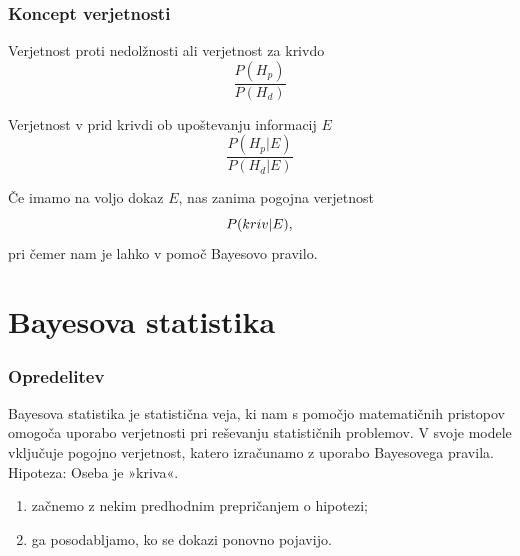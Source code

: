 \documentclass{beamer}
\begin{document}
\begin{frame}
    \frametitle{Koncept verjetnosti}
    \begin{beamerboxesrounded}[]{Verjetnost proti nedolžnosti ali verjetnost za krivdo}
        \[
            \frac{P(H_p)}{P(H_d)}
        \]    
    \end{beamerboxesrounded} \vspace{3mm}
    \begin{beamerboxesrounded}[]{Verjetnost v prid krivdi ob upoštevanju informacij $E$}
        \[
            \frac{P(H_p \lvert E)}{P(H_d \lvert E)} 
        \]    
    \end{beamerboxesrounded} \vspace{5mm}
    Če imamo na voljo dokaz $E$, nas zanima pogojna verjetnost
    \[
        P(kriv \lvert E), \vspace{2mm}
    \]
    pri čemer nam je lahko v pomoč Bayesovo pravilo.
\end{frame}

\section{Bayesova statistika}

\begin{frame}
    \frametitle{Opredelitev}
    Bayesova statistika je statistična veja, ki nam s pomočjo matematičnih pristopov omogoča uporabo verjetnosti pri reševanju statističnih 
    problemov. V svoje modele vključuje pogojno verjetnost, katero izračunamo z uporabo Bayesovega pravila. \\ \vspace{3mm}
    Hipoteza: Oseba je »kriva«.
    \begin{enumerate}
        \item začnemo z nekim predhodnim prepričanjem o hipotezi;
        \item ga posodabljamo, ko se dokazi ponovno pojavijo.
    \end{enumerate}
\end{frame}
\end{document}

